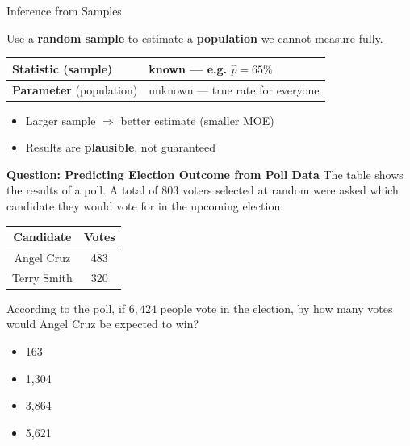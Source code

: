 \documentclass{beamer}
\begin{document}
\begin{frame}{Inference from Samples}
\small

Use a \textbf{random sample} to estimate a \textbf{population} we cannot measure fully.

\vspace{0.2cm}
\begin{center}
\begin{tabular}{|l|l|}
\hline
\textbf{Statistic} (sample) & known --- e.g. $\hat{p} = 65\%$ \\
\hline
\textbf{Parameter} (population) & unknown --- true rate for everyone \\
\hline
\end{tabular}
\end{center}

\vspace{0.2cm}
\begin{itemize}
    \item Larger sample $\Rightarrow$ better estimate (smaller MOE)
    \item Results are \textbf{plausible}, not guaranteed
\end{itemize}

\end{frame}


\begin{frame}{\textbf{Question: Predicting Election Outcome from Poll Data}}
The table shows the results of a poll. A total of \( 803 \) voters selected at random were asked which candidate they would vote for in the upcoming election.

\begin{center}
\begin{tabular}{|c|c|}
\hline
\textbf{Candidate} & \textbf{Votes} \\
\hline
Angel Cruz & 483 \\
Terry Smith & 320 \\
\hline
\end{tabular}
\end{center}

According to the poll, if \( 6{,}424 \) people vote in the election, by how many votes would Angel Cruz be expected to win?

\begin{itemize}
    \item[A.] 163
    \item[B.] 1,304
    \item[C.] 3,864
    \item[D.] 5,621
\end{itemize}
\end{frame}
\end{document}
